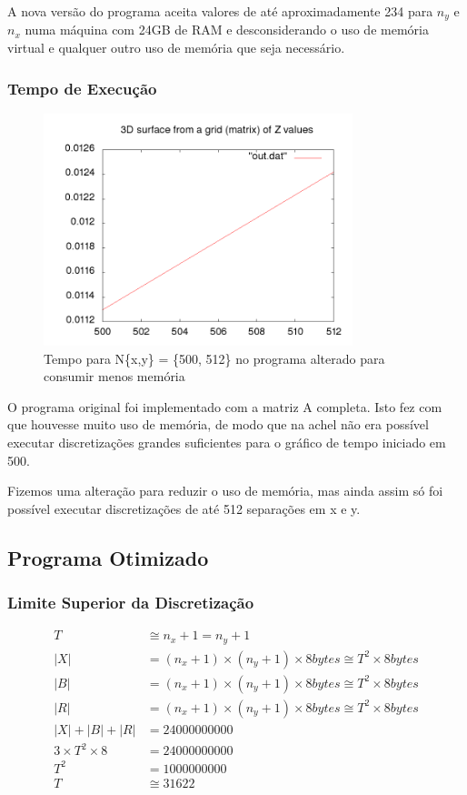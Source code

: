 \documentclass[12pt]{article}
\begin{document}
	A nova versão do programa aceita valores de até aproximadamente 234 para $n_y$ e $n_x$ numa máquina com 24GB de 	RAM e desconsiderando o uso de memória virtual e qualquer outro uso de memória que seja necessário.

	\subsubsection{Tempo de Execução}
	\begin{figure}[ht!]
		\centering
		\includegraphics[width=90mm]{oldtime.png}
		\caption{Tempo para N\{x,y\} = \{500, 512\} no programa alterado para consumir menos memória
		\label{overflow}}
	\end{figure}
	
	O programa original foi implementado com a matriz A completa.
	Isto fez com que houvesse muito uso de memória, de modo que na achel não era possível executar discretizações grandes suficientes para o gráfico de tempo iniciado em 500.
	
	Fizemos uma alteração para reduzir o uso de memória, mas ainda assim só foi possível executar discretizações de até 512 separações em x e y.
	
	\subsection{Programa Otimizado}
	\subsubsection{Limite Superior da Discretização}

	\begin{align}
		T &\cong n_x + 1 = n_y + 1 \\
		|X| &= (n_x+1)\times(n_y+1)\times8 bytes \cong T^2\times8 bytes \\
		|B| &= (n_x+1)\times(n_y+1)\times8 bytes \cong T^2\times8 bytes \\
		|R| &= (n_x+1)\times(n_y+1)\times8 bytes \cong T^2\times8 bytes \\
		|X| + |B| + |R| &= 24000000000 \\
		3\times T^2\times8 &= 24000000000 \\
		T^2 &= 1000000000\\
		T &\cong 31622
	\end{align}
\end{document}

